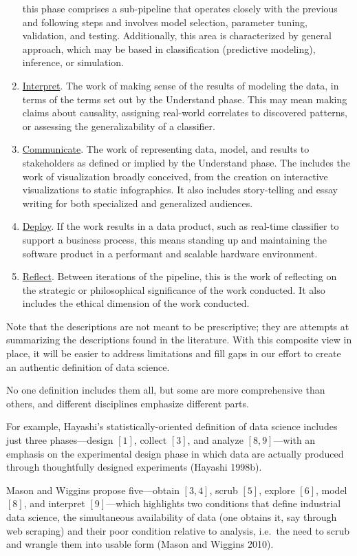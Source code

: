 \documentclass[
  letterpaper,
]{report}
\begin{document}
\begin{enumerate}
  this phase comprises a sub-pipeline that operates closely with the
  previous and following steps and involves model selection, parameter
  tuning, validation, and testing. Additionally, this area is
  characterized by general approach, which may be based in
  classification (predictive modeling), inference, or simulation.
\item
  \uline{Interpret}. The work of making sense of the results of modeling
  the data, in terms of the terms set out by the Understand phase. This
  may mean making claims about causality, assigning real-world
  correlates to discovered patterns, or assessing the generalizability
  of a classifier.
\item
  \uline{Communicate}. The work of representing data, model, and results
  to stakeholders as defined or implied by the Understand phase. The
  includes the work of visualization broadly conceived, from the
  creation on interactive visualizations to static infographics. It also
  includes story-telling and essay writing for both specialized and
  generalized audiences.
\item
  \uline{Deploy}. If the work results in a data product, such as
  real-time classifier to support a business process, this means
  standing up and maintaining the software product in a performant and
  scalable hardware environment.
\item
  \uline{Reflect}. Between iterations of the pipeline, this is the work
  of reflecting on the strategic or philosophical significance of the
  work conducted. It also includes the ethical dimension of the work
  conducted.
\end{enumerate}

Note that the descriptions are not meant to be prescriptive; they are
attempts at summarizing the descriptions found in the literature. With
this composite view in place, it will be easier to address limitations
and fill gaps in our effort to create an authentic definition of data
science.

No one definition includes them all, but some are more comprehensive
than others, and different disciplines emphasize different parts.

For example, Hayashi's statistically-oriented definition of data science
includes just three phases---design \([1]\), collect \([3]\), and
analyze \([8, 9]\)---with an emphasis on the experimental design phase
in which data are actually produced through thoughtfully designed
experiments (Hayashi 1998b).

Mason and Wiggins propose five---obtain \([3, 4]\), scrub \([5]\),
explore \([6]\), model \([8]\), and interpret \([9]\)---which highlights
two conditions that define industrial data science, the simultaneous
availability of data (one obtains it, say through web scraping) and
their poor condition relative to analysis, i.e.~the need to scrub and
wrangle them into usable form (Mason and Wiggins 2010).
\end{document}

